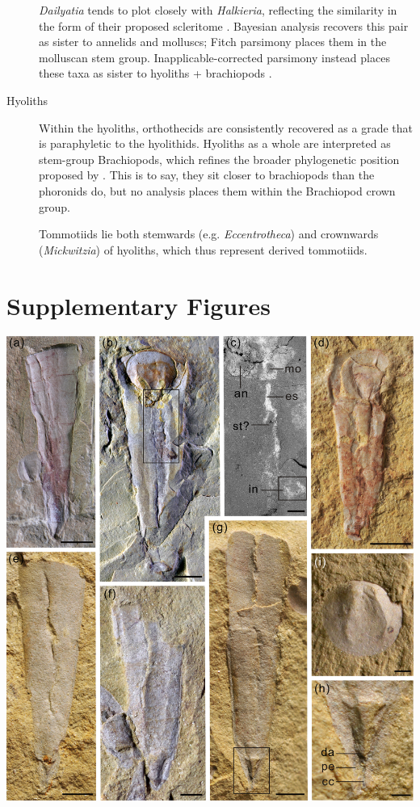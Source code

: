 \documentclass[openany]{book}
\begin{document}
\begin{description}
\emph{Dailyatia} tends to plot closely with \emph{Halkieria}, reflecting
the similarity in the form of their proposed scleritome
\citep{Skovsted2015Theearly}. Bayesian analysis recovers this pair as
sister to annelids and molluscs; Fitch parsimony places them in the
molluscan stem group. Inapplicable-corrected parsimony instead places
these taxa as sister to hyoliths + brachiopods \citep[cf.][]{Zhao2017}.
\item[Hyoliths]
Within the hyoliths, orthothecids are consistently recovered as a grade
that is paraphyletic to the hyolithids. Hyoliths as a whole are
interpreted as stem-group Brachiopods, which refines the broader
phylogenetic position proposed by \citet{Moysiuk2017Hyolithsare}. This
is to say, they sit closer to brachiopods than the phoronids do, but no
analysis places them within the Brachiopod crown group.

Tommotiids lie both stemwards (e.g. \emph{Eccentrotheca}) and crownwards
(\emph{Mickwitzia}) of hyoliths, which thus represent derived
tommotiids.
\end{description}

\hypertarget{figures}{\chapter*{Supplementary Figures}\label{figures}}

\begin{center}\includegraphics[width=0.8\linewidth]{images/image1} \end{center}
\end{document}
